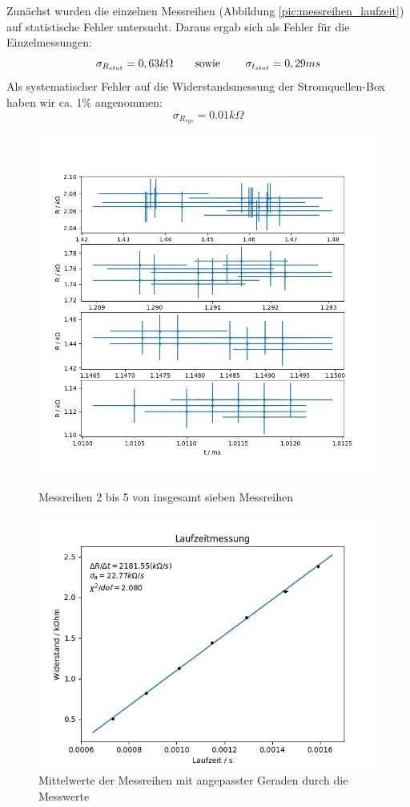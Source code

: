 \documentclass[12pt,a4paper]{article}
\begin{document}
Zunächst wurden die einzelnen Messreihen (Abbildung \ref{pic:messreihen_laufzeit}) auf statistische Fehler untersucht. Daraus ergab sich als Fehler für die Einzelmessungen:
\begin{equation}
\sigma _{R_{stat}} = 0,63 k\Omega \text{\qquad sowie \qquad} \sigma_{t_{stat}} = 0,29 ms
\end{equation}
Als systematischer Fehler auf die Widerstandsmessung der Stromquellen-Box haben wir ca. 1\% angenommen: 
\begin{equation}
\sigma_{R_{sys}} = 0.01 k \Omega
\end{equation}
\begin{figure}
	\begin{center}
		\includegraphics[width=0.75\linewidth]{messreihen_2bis5_laufzeit}
		\caption{Messreihen 2 bis 5 von insgesamt sieben Messreihen}
		\label{pic:messreihen_laufzeit}
		
		\includegraphics[width=0.7\linewidth]{fit_laufzeit}
		\caption{Mittelwerte der Messreihen mit angepasster Geraden durch die Messwerte}
		\label{pic:fit_laufzeit}
	\end{center}
\end{figure}
\end{document}
